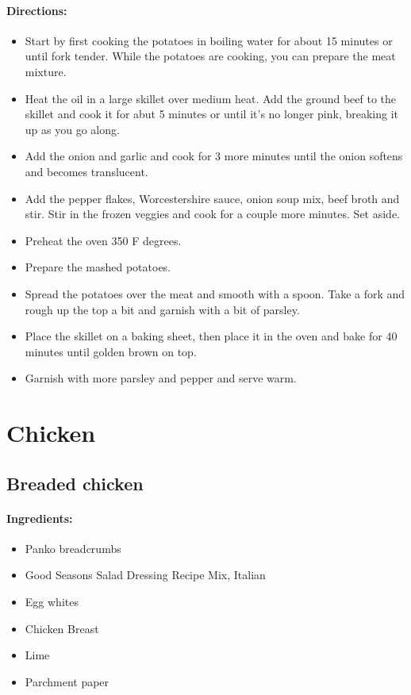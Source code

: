 \documentclass{article}
\begin{document}
\paragraph{Directions:}
\begin{itemize}
  \item Start by first cooking the potatoes in boiling water for about 15 minutes or until fork tender. While the
potatoes are cooking, you can prepare the meat mixture.
  \item Heat the oil in a large skillet over medium heat. Add the ground beef to the skillet and cook it for abut
5 minutes or until it’s no longer pink, breaking it up as you go along.
  \item Add the onion and garlic and cook for 3 more minutes until the onion softens and becomes translucent.
  \item Add the pepper flakes, Worcestershire sauce, onion soup mix, beef broth and stir. Stir in the frozen
veggies and cook for a couple more minutes. Set aside.
  \item Preheat the oven 350 F degrees.
  \item Prepare the mashed potatoes.
  \item Spread the potatoes over the meat and smooth with a spoon. Take a fork and rough up the top a bit and
garnish with a bit of parsley.
  \item Place the skillet on a baking sheet, then place it in the oven and bake for 40 minutes until golden brown
on top.
  \item Garnish with more parsley and pepper and serve warm.
\end{itemize}


\section{Chicken}

\subsection{Breaded chicken}

\paragraph{Ingredients:}

\begin{itemize}
	\item Panko breadcrumbs
	\item Good Seasons Salad Dressing Recipe Mix, Italian
	\item Egg whites
	\item Chicken Breast
	\item Lime
	\item Parchment paper
\end{itemize}
\end{document}
